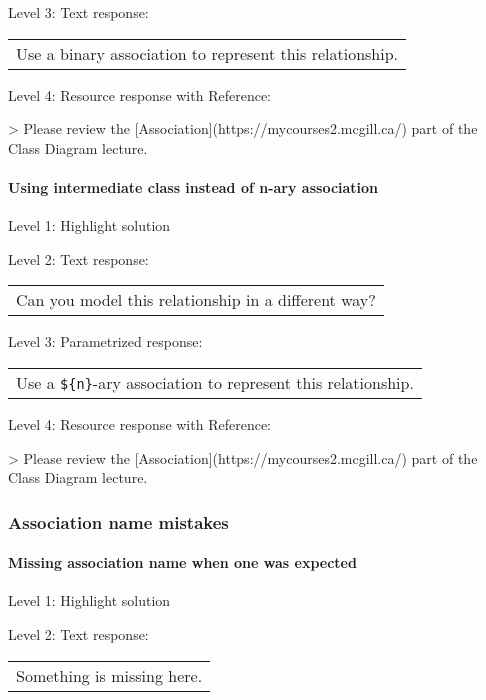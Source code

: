 \noindent Level 3: Text response: \medskip

\begin{tabular}{|c}
Use a binary association to represent this relationship.
\end{tabular} \medskip

\noindent Level 4: Resource response with Reference:

> Please review the [Association](https://mycourses2.mcgill.ca/) part of the Class Diagram lecture.


\paragraph{Using intermediate class instead of n-ary association}

\noindent Level 1: Highlight solution \medskip

\noindent Level 2: Text response: \medskip

\begin{tabular}{|c}
Can you model this relationship in a different way?
\end{tabular} \medskip

\noindent Level 3: Parametrized response: \medskip

\begin{tabular}{|c}
Use a \verb|${n}|-ary association to represent this relationship.
\end{tabular} \medskip

\noindent Level 4: Resource response with Reference:

> Please review the [Association](https://mycourses2.mcgill.ca/) part of the Class Diagram lecture.


\subsubsection{Association name mistakes}

\paragraph{Missing association name when one was expected}

\noindent Level 1: Highlight solution \medskip

\noindent Level 2: Text response: \medskip

\begin{tabular}{|c}
Something is missing here.
\end{tabular} \medskip

